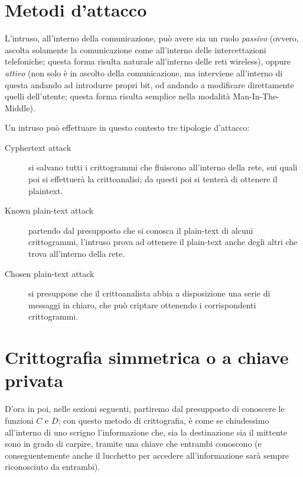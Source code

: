\section{Metodi d'attacco}
L'intruso, all'interno della comunicazione, può avere sia un ruolo \textit{passivo}
(ovvero, ascolta solamente la comunicazione come all'interno delle intercettazioni
telefoniche; questa forma risulta naturale all'interno delle reti wireless), 
oppure \textit{attivo} (non solo è in ascolto della comunicazione, ma
interviene all'interno di questa andando ad introdurre propri bit, od andando
a modificare direttamente quelli dell'utente; questa forma risulta semplice
nella modalità Man-In-The-Middle). 

Un intruso può effettuare in questo contesto tre tipologie d'attacco:
\begin{description}
\item[Cyphertext attack] si salvano tutti i crittogrammi che fluiscono all'interno
	della rete, sui quali poi si effettuerà la crittoanalisi; da questi
	poi si tenterà di ottenere il plaintext.
\item[Known plain-text attack] partendo dal presupposto che si conosca il 
	plain-text di alcuni crittogrammi, l'intruso prova ad ottenere il 
	plain-text anche degli altri che trova all'interno della rete.
\item[Chosen plain-text attack] si presuppone che il crittoanalista abbia a
	disposizione una serie di messaggi in chiaro, che può criptare ottenendo
	i corrispondenti crittogrammi.
\end{description}

\section{Crittografia simmetrica o a chiave privata}
D'ora in poi, nelle sezioni seguenti, partiremo dal presupposto di conoscere
le funzioni $C$ e $D$; con questo metodo di crittografia, è come se chiudessimo
all'interno di uno scrigno l'informazione che, sia la destinazione sia il mittente
sono in grado di carpire, tramite una chiave che entrambi conoscono (e 
conseguentemente anche il lucchetto per accedere all'informazione sarà sempre
riconosciuto da entrambi).

